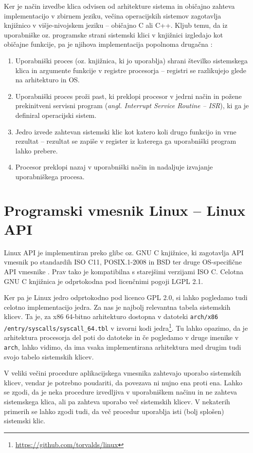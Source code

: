 \documentclass[a4paper,12pt,openright]{book}
\begin{document}
Ker je način izvedbe klica odvisen od arhitekture sistema in običajno zahteva implementacijo v zbirnem jeziku, večina operacijskih sistemov zagotavlja knjižnico v višje-nivojskem jeziku -- običajno C ali C++.
Kljub temu, da iz uporabniške oz. programske strani sistemski klici v knjižnici izgledajo kot običajne funkcije, pa je njihova implementacija popolnoma drugačna \cite{Tanenbaum_Bos_2023}:
\begin{enumerate}
	\item Uporabniški proces (oz. knjižnica, ki jo uporablja) shrani številko sistemskega klica in argumente funkcije v registre procesorja -- registri se razlikujejo glede na arhitekturo in OS.
	\item Uporabniški proces proži past, ki preklopi procesor v jedrni način in požene prekinitveni servisni program (\textit{angl. Interrupt Service Routine -- ISR}), ki ga je definiral operacijski sistem.
	\item Jedro izvede zahtevan sistemski klic kot katero koli drugo funkcijo in vrne rezultat -- rezultat se zapiše v register iz katerega ga uporabniški program lahko prebere.
	\item Procesor preklopi nazaj v uporabniški način in nadaljuje izvajanje uporabniškega procesa.
\end{enumerate}

\section{Programski vmesnik Linux -- Linux API}

Linux API je implementiran preko glibc oz. GNU C knjižnice, ki zagotavlja API vmesnik po standardih ISO C11, POSIX.1-2008 in BSD ter druge OS-specifične API vmesnike \cite{GNU_Manual}.
Prav tako je kompatibilna s starejšimi verzijami ISO C.
Celotna GNU C knjižnica je odprtokodna pod licenčnimi pogoji LGPL 2.1.

Ker pa je Linux jedro odprtokodno pod licenco GPL 2.0, si lahko pogledamo tudi celotno implementacijo jedra.
Za nas je najbolj relevantna tabela sistemskih klicev.
Ta je, za x86 64-bitno arhitekturo dostopna v datoteki \texttt{arch/x86} \texttt{/entry/syscalls/syscall\_64.tbl} v izvorni kodi jedra\footnote{\url{https://github.com/torvalds/linux}}.
Tu lahko opazimo, da je arhitektura procesorja del poti do datoteke in če pogledamo v druge imenike v \texttt{arch}, lahko vidimo, da ima vsaka implementirana arhitektura med drugim tudi svojo tabelo sistemskih klicev.

V veliki večini procedure aplikacijskega vmesnika zahtevajo uporabo sistemskih klicev, vendar je potrebno poudariti, da povezava ni nujno ena proti ena.
Lahko se zgodi, da je neka procedure izvedljiva v uporabniškem načinu in ne zahteva sistemskega klica, ali pa zahteva uporabo več sistemskih klicev.
V nekaterih primerih se lahko zgodi tudi, da več procedur uporablja isti (bolj splošen) sistemski klic.
\end{document}
